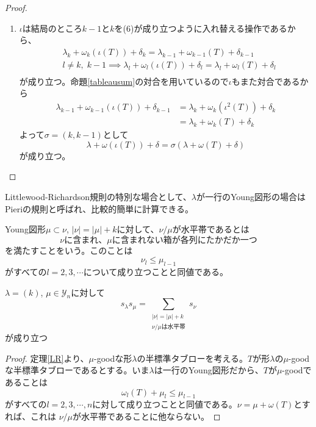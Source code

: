 \documentclass{ltjsreport}
\begin{document}
\begin{proof}
\begin{enumerate}
        \item $\iota$は結局のところ$k-1$と$k$を(6)が成り立つように入れ替える操作であるから、
        \begin{align*}
            &\lambda_{k}+\omega_k(\iota(T))+\delta_k=\lambda_{k-1}+\omega_{k-1}(T)+\delta_{k-1}\\
            & l\neq k,\;k-1\implies \lambda_{l}+\omega_l(\iota(T))+\delta_l=\lambda_{l}+\omega_{l}(T)+\delta_{l}\\
        \end{align*}
        が成り立つ。命題\ref{tableausum}の対合を用いているので$\iota$もまた対合であるから
        \begin{align*}
            \lambda_{k-1}+\omega_{k-1}(\iota(T))+\delta_{k-1}
            &=\lambda_{k}+\omega_{k}(\iota^2(T))+\delta_k\\
            &=\lambda_{k}+\omega_{k}(T)+\delta_k
        \end{align*}
        よって$\sigma=(k, k-1)$として
        \[
            \lambda+\omega(\iota(T))+\delta=\sigma(\lambda+\omega(T)+\delta)
        \]
        が成り立つ。
    \end{enumerate}
\end{proof}



Littlewood-Richardson規則の特別な場合として、$\lambda$が一行のYoung図形の場合はPieriの規則と呼ばれ、比較的簡単に計算できる。

\begin{defin}
    Young図形$\mu\subset \nu$, $|\nu|=|\mu|+k$に対して、$\nu/\mu$が水平帯であるとは
    \[
    \text{
        $\nu$に含まれ、$\mu$に含まれない箱が各列にたかだか一つ
        }
    \]
    を満たすことをいう。このことは
    \[
    \nu_l\leq \mu_{l-1}    
    \]
    がすべての$l=2,3,\cdots$について成り立つことと同値である。
\end{defin}

\begin{theo}[Pieriの規則]\label{Pieri}
    $\lambda=(k)$, $\mu\in\mathcal{Y}_n$に対して
    \[
    s_\lambda s_\mu=\sum_{\substack{|\nu|=|\mu|+k\\\nu/\mu\text{は水平帯}}}s_\nu    
    \]
    が成り立つ
\end{theo}

\begin{proof}
    定理\ref{LR}より、$\mu$-goodな形$\lambda$の半標準タブローを考える。$T$が形$\lambda$の$\mu$-goodな半標準タブローであるとする。いま$\lambda$は一行のYoung図形だから、$T$が$\mu$-goodであることは
    \[
    \omega_{l}(T)+\mu_l\leq \mu_{l-1}    
    \]
    がすべての$l=2,3,\cdots, n$に対して成り立つことと同値である。$\nu=\mu+\omega(T)$とすれば、これは
    $\nu/\mu$が水平帯であることに他ならない。
\end{proof}
\end{document}
